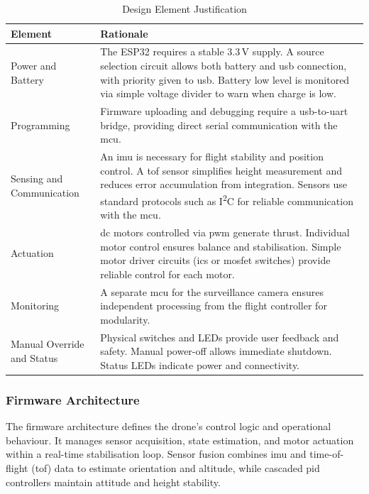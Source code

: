 \renewcommand{\arraystretch}{1.2}
\begin{table}[H]
\centering
\caption{Design Element Justification}
\label{tab:hardware-justification}
\begin{tabular}{|p{}|p{}|}
\hline
\rowcolor{gray!15}
\textbf{Element} & \textbf{Rationale} \\
\hline
Power and Battery & The ESP32 requires a stable 3.3\,V supply. A source selection circuit allows both battery and \gls{usb} connection, with priority given to \gls{usb}. Battery low level is monitored via simple voltage divider to warn when charge is low. \\
\hline
Programming & Firmware uploading and debugging require a \gls{usb}-to-\gls{uart} bridge, providing direct serial communication with the \gls{mcu}. \\
\hline
Sensing and Communication & An \gls{imu} is necessary for flight stability and position control. A \gls{tof} sensor simplifies height measurement and reduces error accumulation from integration. Sensors use standard protocols such as I\textsuperscript{2}C for reliable communication with the \gls{mcu}. \\
\hline
Actuation & \gls{dc} motors controlled via \gls{pwm} generate thrust. Individual motor control ensures balance and stabilisation. Simple motor driver circuits (\glspl{ic} or \gls{mosfet} switches) provide reliable control for each motor. \\
\hline
Monitoring & A separate \gls{mcu} for the surveillance camera ensures independent processing from the flight controller for modularity. \\
\hline
Manual Override and Status & Physical switches and LEDs provide user feedback and safety. Manual power-off allows immediate shutdown. Status LEDs indicate power and connectivity. \\
\hline
\end{tabular}
\end{table}

\subsubsection{Firmware Architecture}
The firmware architecture defines the drone’s control logic and operational behaviour. It manages sensor acquisition, state estimation, and motor actuation within a real-time stabilisation loop. Sensor fusion combines \gls{imu} and time-of-flight (\gls{tof}) data to estimate orientation and altitude, while cascaded \gls{pid} controllers maintain attitude and height stability.  

